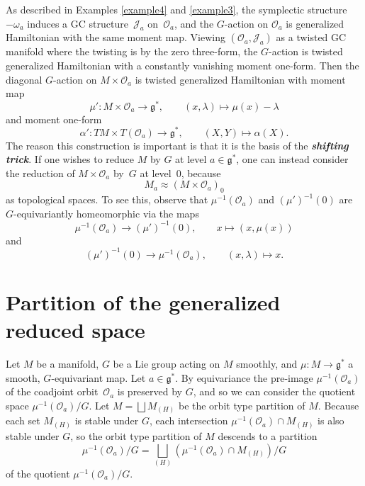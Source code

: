 \documentclass[pdftex]{sigma}
\numberwithin{equation}{section}
\newcommand{\deff}[1]{\textbf{\emph{#1}}}
\newcommand{\func}[3]{#1 \colon #2 \to #3}
\newcommand{\tang}{T}
\begin{document}
As described in Examples \ref{example4} and \ref{example3}, the symplectic structure $-\omega_{a}$ induces a GC structure~$\mathcal{J}_{a}$ on~$\mathcal{O}_{a}$, and the $G$-action on $\mathcal{O}_{a}$ is generalized Hamiltonian with the same moment map.  Viewing $(\mathcal{O}_{a},\mathcal{J}_{a})$ as a twisted GC manifold where the twisting is by the zero three-form, the $G$-action is twisted generalized Hamiltonian with a constantly vanishing moment one-form.  Then the diagonal $G$-action on $M \times \mathcal{O}_{a}$ is twisted generalized Hamiltonian with moment map
\[
  \func{\mu'}{M \times \mathcal{O}_{a}}{\mathfrak{g}^*},
  \qquad (x,\lambda) \mapsto \mu(x) - \lambda
\]
and moment one-form
\[
  \func{\alpha'}{
  \tang M \times \tang (\mathcal{O}_{a})}{
  \mathfrak{g}^*},
  \qquad
  (X,Y) \mapsto \alpha(X).
\]
The reason this construction is important is that it is the basis of the \deff{shifting trick}.  If one wishes to reduce $M$ by $G$ at level $a \in \mathfrak{g}^*$, one can instead consider the reduction of $M \times \mathcal{O}_{a}$ by~$G$ at level~$0$, because
\[
  M_a \approx (M \times \mathcal{O}_{a})_0
\]
as topological spaces.
To see this, observe that $\mu^{-1}(\mathcal{O}_a)$ and $(\mu')^{-1}(0)$ are $G$-equivariantly homeomorphic via the maps
\[
  \mu^{-1}(\mathcal{O}_a) \to (\mu')^{-1}(0),
  \qquad
  x \mapsto \left(x, \mu(x) \right)
\]
and
\[
  (\mu')^{-1}(0) \to \mu^{-1}(\mathcal{O}_a),
  \qquad
  (x, \lambda) \mapsto x.
\]


\section{Partition of the generalized reduced space}\label{section4}


Let $M$ be a manifold, $G$ be a Lie group acting on $M$ smoothly, and $\func{\mu}{M}{\mathfrak{g}^*}$ a smooth, $G$-equivariant map.
Let $a \in \mathfrak{g}^*$.
By equivariance the pre-image $\mu^{-1}(\mathcal{O}_a)$ of the coadjoint orbit~$\mathcal{O}_a$ is preserved by $G$, and so we can consider the quotient space $\mu^{-1}(\mathcal{O}_a) / G$.
Let $M = \bigsqcup M_{(H)}$ be the orbit type partition of $M$.
Because each set $M_{(H)}$ is stable under $G$, each intersection $\mu^{-1}(\mathcal{O}_a) \cap M_{(H)}$ is also stable under $G$,
so the orbit type partition of $M$ descends to a partition
\[
  \mu^{-1}(\mathcal{O}_a) / G
  = \bigsqcup_{(H)} \left( \mu^{-1}(\mathcal{O}_a) \cap M_{(H)} \right) / G
\]
of the quotient $\mu^{-1}(\mathcal{O}_a) / G$.
\end{document}

